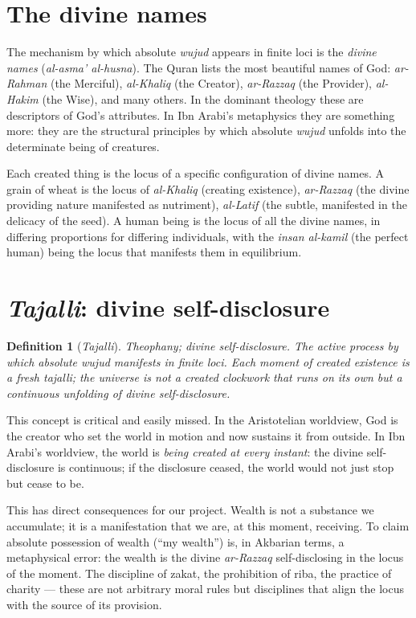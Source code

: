 \documentclass[11pt,a4paper]{book}
\theoremstyle{cleanrm}
\newtheorem{definition}{Definition}[chapter]
\begin{document}
\section{The divine names}

The mechanism by which absolute \emph{wujud} appears in finite loci is
the \emph{divine names} (\emph{al-asma' al-husna}). The Quran lists
the most beautiful names of God: \emph{ar-Rahman} (the Merciful),
\emph{al-Khaliq} (the Creator), \emph{ar-Razzaq} (the Provider),
\emph{al-Hakim} (the Wise), and many others. In the dominant theology
these are descriptors of God's attributes. In Ibn Arabi's metaphysics
they are something more: they are the structural principles by which
absolute \emph{wujud} unfolds into the determinate being of creatures.

Each created thing is the locus of a specific configuration of divine
names. A grain of wheat is the locus of \emph{al-Khaliq} (creating
existence), \emph{ar-Razzaq} (the divine providing nature manifested
as nutriment), \emph{al-Latif} (the subtle, manifested in the
delicacy of the seed). A human being is the locus of all the divine
names, in differing proportions for differing individuals, with the
\emph{insan al-kamil} (the perfect human) being the locus that
manifests them in equilibrium.

\section{\emph{Tajalli}: divine self-disclosure}

\begin{definition}[\emph{Tajalli}]
Theophany; divine self-disclosure. The active process by which
absolute \emph{wujud} manifests in finite loci. Each moment of
created existence is a fresh \emph{tajalli}; the universe is not a
created clockwork that runs on its own but a continuous unfolding of
divine self-disclosure.
\end{definition}

This concept is critical and easily missed. In the Aristotelian
worldview, God is the creator who set the world in motion and now
sustains it from outside. In Ibn Arabi's worldview, the world is
\emph{being created at every instant}: the divine self-disclosure is
continuous; if the disclosure ceased, the world would not just stop
but cease to be.

This has direct consequences for our project. Wealth is not a
substance we accumulate; it is a manifestation that we are, at this
moment, receiving. To claim absolute possession of wealth (``my
wealth'') is, in Akbarian terms, a metaphysical error: the wealth is
the divine \emph{ar-Razzaq} self-disclosing in the locus of the
moment. The discipline of zakat, the prohibition of riba, the practice
of charity --- these are not arbitrary moral rules but disciplines
that align the locus with the source of its provision.
\end{document}

